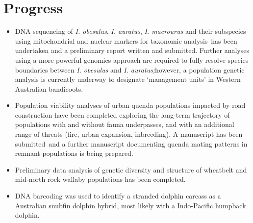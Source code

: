 \documentclass[version=last,
    paper=a4, %
    10pt, %
    usenames,
    dvipsnames,
    oneside, %
    headings=openany, %
    DIV=15 %
]{scrbook}
\begin{document}
\section*{Progress}
\begin{itemize}
\itemsep1pt\parskip0pt
\item
  DNA sequencing of \emph{I. obesulus}, \emph{I. auratus}, \emph{I.
  macrourus} and their subspecies using mitochondrial and nuclear
  markers for taxonomic analysis~has been undertaken and a preliminary
  report written and submitted. Further analyses using a more powerful
  genomics approach are required to fully resolve species boundaries
  between \emph{I. obesulus} and \emph{I. auratus;}however, a population
  genetic analysis is currently underway to designate `management units'
  in Western Australian bandicoots.
\item
  Population viability analyses of urban quenda populations impacted by
  road construction have been completed exploring the long-term
  trajectory of populations with and without fauna underpasses, and with
  an additional range of threats (fire, urban expansion, inbreeding). A
  manuscript has been submitted~and a further manuscript documenting
  quenda mating patterns in remnant populations is being prepared.
\item
  Preliminary data analysis of genetic diversity and structure of
  wheatbelt and mid-north rock wallaby populations has been completed.
\item
  DNA barcoding was used to identify a stranded dolphin carcass as a
  Australian snubfin dolphin hybrid, most likely with a Indo-Pacific
  humpback dolphin.
\end{itemize}
\end{document}
